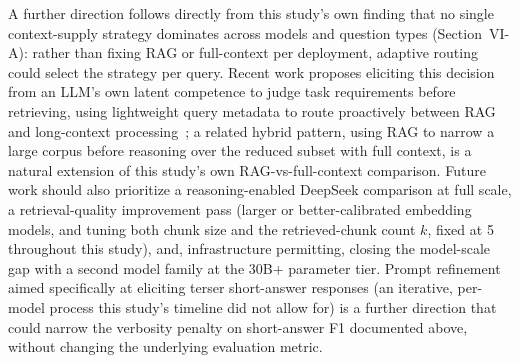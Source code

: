 \documentclass[conference]{IEEEtran}
\begin{document}
A further direction follows directly from this study's own finding that no single context-supply strategy dominates across models and question types (Section~VI-A): rather than fixing RAG or full-context per deployment, adaptive routing could select the strategy per query.
Recent work proposes eliciting this decision from an \gls{LLM}'s own latent competence to judge task requirements before retrieving, using lightweight query metadata to route proactively between RAG and long-context processing~\cite{chen2026routebeforeretrieve}; a related hybrid pattern, using RAG to narrow a large corpus before reasoning over the reduced subset with full context, is a natural extension of this study's own RAG-vs-full-context comparison.
Future work should also prioritize a reasoning-enabled DeepSeek comparison at full scale, a retrieval-quality improvement pass (larger or better-calibrated embedding models, and tuning both chunk size and the retrieved-chunk count $k$, fixed at 5 throughout this study), and, infrastructure permitting, closing the model-scale gap with a second model family at the 30B+ parameter tier.
Prompt refinement aimed specifically at eliciting terser short-answer responses (an iterative, per-model process this study's timeline did not allow for) is a further direction that could narrow the verbosity penalty on short-answer F1 documented above, without changing the underlying evaluation metric.



\end{document}
